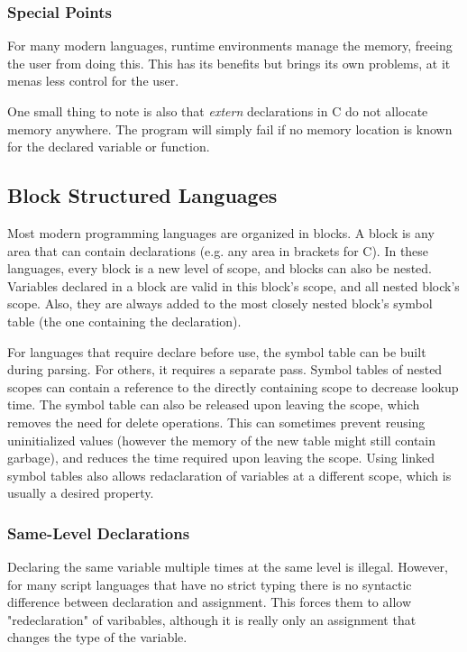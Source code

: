 \documentclass{article}
\begin{document}
\subsubsection{Special Points}
For many modern languages, runtime environments manage the memory, freeing the user from doing this.
This has its benefits but brings its own problems, at it menas less control for the user.

One small thing to note is also that \emph{extern} declarations in C do not allocate memory anywhere.
The program will simply fail if no memory location is known for the declared variable or function.

\subsection{Block Structured Languages}
Most modern programming languages are organized in blocks.
A block is any area that can contain declarations (e.g. any area in brackets for C).
In these languages, every block is a new level of scope, and blocks can also be nested.
Variables declared in a block are valid in this block's scope, and all nested block's scope.
Also, they are always added to the most closely nested block's symbol table (the one containing the declaration).

For languages that require declare before use, the symbol table can be built during parsing.
For others, it requires a separate pass.
Symbol tables of nested scopes can contain a reference to the directly containing scope to decrease lookup time.
The symbol table can also be released upon leaving the scope, which removes the need for delete operations.
This can sometimes prevent reusing uninitialized values (however the memory of the new table might still contain garbage), and reduces the time required upon leaving the scope.
Using linked symbol tables also allows redaclaration of variables at a different scope, which is usually a desired property.

\subsubsection{Same-Level Declarations}
Declaring the same variable multiple times at the same level is illegal.
However, for many script languages that have no strict typing there is no syntactic difference between declaration and assignment.
This forces them to allow "redeclaration" of varibables, although it is really only an assignment that changes the type of the variable.
\end{document}
